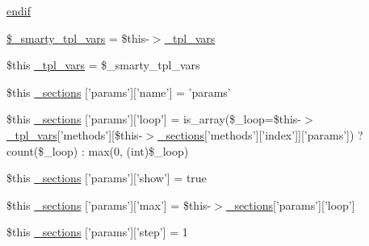 \begin{DoxyCompactItemize}
\item 
\hyperlink{34d6fa4bfd5eef6424a9ddc74a166350_2_06_06-14_05_06_06-1407541581_05method_8tpl_8php_a82cd33ca97ff99f2fcc5e9c81d65251b}{endif}
\item 
\hyperlink{34d6fa4bfd5eef6424a9ddc74a166350_2_06_06-14_05_06_06-1407541581_05method_8tpl_8php_a14dde6d029d65a879ee7bc1ebc398dd1}{\$\-\_\-smarty\-\_\-tpl\-\_\-vars} = \$this-\/$>$\hyperlink{_06_06127_05_06_0612781687_05pkgelementindex_8tpl_8php_a4a4846d8e68d455590131a05697f67a3}{\-\_\-tpl\-\_\-vars}
\item 
\$this \hyperlink{34d6fa4bfd5eef6424a9ddc74a166350_2_06_06-14_05_06_06-1407541581_05method_8tpl_8php_a4a4846d8e68d455590131a05697f67a3}{\-\_\-tpl\-\_\-vars} = \$\-\_\-smarty\-\_\-tpl\-\_\-vars
\item 
\$this \hyperlink{34d6fa4bfd5eef6424a9ddc74a166350_2_06_06-14_05_06_06-1407541581_05method_8tpl_8php_af0c558580cadde41ff509db542bdc0fa}{\-\_\-sections} \mbox{[}'params'\mbox{]}\mbox{[}'name'\mbox{]} = 'params'
\item 
\$this \hyperlink{34d6fa4bfd5eef6424a9ddc74a166350_2_06_06-14_05_06_06-1407541581_05method_8tpl_8php_a9d3e8a5d01be8e45d5623bdb21004c73}{\-\_\-sections} \mbox{[}'params'\mbox{]}\mbox{[}'loop'\mbox{]} = is\-\_\-array(\$\-\_\-loop=\$this-\/$>$\hyperlink{_06_06127_05_06_0612781687_05pkgelementindex_8tpl_8php_a4a4846d8e68d455590131a05697f67a3}{\-\_\-tpl\-\_\-vars}\mbox{[}'methods'\mbox{]}\mbox{[}\$this-\/$>$\hyperlink{_06_06127_05_06_0612781687_05pkgelementindex_8tpl_8php_a9e3d26b39edfe29c3f29b8035ef33828}{\-\_\-sections}\mbox{[}'methods'\mbox{]}\mbox{[}'index'\mbox{]}\mbox{]}\mbox{[}'params'\mbox{]}) ? count(\$\-\_\-loop) \-: max(0, (int)\$\-\_\-loop)
\item 
\$this \hyperlink{34d6fa4bfd5eef6424a9ddc74a166350_2_06_06-14_05_06_06-1407541581_05method_8tpl_8php_a7483e4eb34499b67a6fb0c13d79fe772}{\-\_\-sections} \mbox{[}'params'\mbox{]}\mbox{[}'show'\mbox{]} = true
\item 
\$this \hyperlink{34d6fa4bfd5eef6424a9ddc74a166350_2_06_06-14_05_06_06-1407541581_05method_8tpl_8php_a2f60b60d8fb7c59b00fb8b963513cda2}{\-\_\-sections} \mbox{[}'params'\mbox{]}\mbox{[}'max'\mbox{]} = \$this-\/$>$\hyperlink{_06_06127_05_06_0612781687_05pkgelementindex_8tpl_8php_a9e3d26b39edfe29c3f29b8035ef33828}{\-\_\-sections}\mbox{[}'params'\mbox{]}\mbox{[}'loop'\mbox{]}
\item 
\$this \hyperlink{34d6fa4bfd5eef6424a9ddc74a166350_2_06_06-14_05_06_06-1407541581_05method_8tpl_8php_a64871533fcee968904deb401cb1d5199}{\-\_\-sections} \mbox{[}'params'\mbox{]}\mbox{[}'step'\mbox{]} = 1

\end{DoxyCompactItemize}
